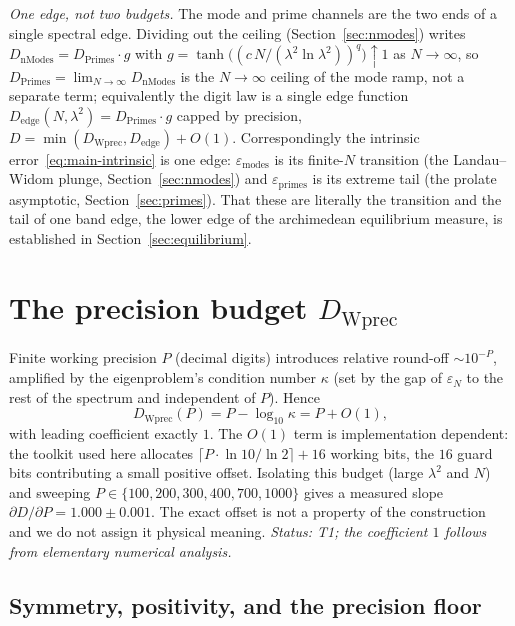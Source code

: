 \documentclass[11pt,a4paper]{article}
\begin{document}
\smallskip
\noindent\emph{One edge, not two budgets.} The mode and prime channels are the
two ends of a single spectral edge. Dividing out the ceiling
(Section~\ref{sec:nmodes}) writes $D_{\mathrm{nModes}}=D_{\mathrm{Primes}}\cdot g$
with $g=\tanh\!\bigl((c\,N/(\lambda^2\ln\lambda^2))^{q}\bigr)\uparrow1$ as
$N\to\infty$, so $D_{\mathrm{Primes}}=\lim_{N\to\infty}D_{\mathrm{nModes}}$ is the
$N\to\infty$ ceiling of the mode ramp, not a separate term; equivalently the
digit law is a single edge function $D_{\mathrm{edge}}(N,\lambda^2)=
D_{\mathrm{Primes}}\cdot g$ capped by precision,
$D=\min(D_{\mathrm{Wprec}},D_{\mathrm{edge}})+O(1)$. Correspondingly the intrinsic
error~\eqref{eq:main-intrinsic} is one edge: $\varepsilon_{\mathrm{modes}}$ is its
finite-$N$ transition (the Landau--Widom plunge, Section~\ref{sec:nmodes}) and
$\varepsilon_{\mathrm{primes}}$ is its extreme tail (the prolate asymptotic,
Section~\ref{sec:primes}). That these are literally the transition and the tail
of one band edge, the lower edge of the archimedean equilibrium measure,
is established in Section~\ref{sec:equilibrium}.

\section{The precision budget $D_{\mathrm{Wprec}}$}\label{sec:wprec}

Finite working precision $P$ (decimal digits) introduces relative round-off
$\sim 10^{-P}$, amplified by the eigenproblem's condition number $\kappa$ (set
by the gap of $\varepsilon_N$ to the rest of the spectrum and independent of
$P$). Hence
\begin{equation}\label{eq:wprec}
  D_{\mathrm{Wprec}}(P)=P-\log_{10}\kappa = P+O(1),
\end{equation}
with leading coefficient exactly $1$. The $O(1)$ term is implementation
dependent: the toolkit used here allocates $\lceil P\cdot\ln10/\ln2\rceil+16$
working bits, the $16$ guard bits contributing a small positive offset. Isolating
this budget (large $\lambda^2$ and $N$) and sweeping $P\in\{100,200,300,400,700,
1000\}$ gives a measured slope $\partial D/\partial P=1.000\pm0.001$. The exact
offset is not a property of the construction and we do not assign it physical
meaning. \emph{Status: T1; the coefficient $1$ follows from elementary numerical
analysis.}

\subsection{Symmetry, positivity, and the precision floor}\label{ssec:evenness}
\end{document}
